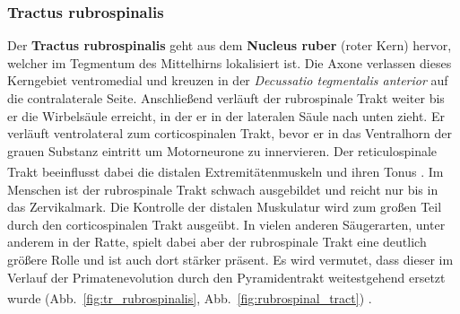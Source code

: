 \subsubsection{Tractus rubrospinalis}  \label{subsubsec:rubrospinalis}
Der \textbf{Tractus rubrospinalis} geht aus dem \textbf{Nucleus ruber} (roter Kern) hervor, welcher im Tegmentum des Mittelhirns lokalisiert ist. Die Axone verlassen dieses Kerngebiet ventromedial und kreuzen in der \textit{Decussatio tegmentalis anterior} auf die contralaterale Seite. Anschließend verläuft der rubrospinale Trakt weiter bis er die Wirbelsäule erreicht, in der er in der lateralen Säule nach unten zieht. Er verläuft ventrolateral zum corticospinalen Trakt, bevor er in das Ventralhorn der grauen Substanz eintritt um Motorneurone zu innervieren. Der reticulospinale Trakt beeinflusst dabei die distalen Extremitätenmuskeln und ihren Tonus \textsuperscript{\cite[8]{crossman2014neuroanatomy}}. Im Menschen ist der rubrospinale Trakt schwach ausgebildet und reicht nur bis in das Zervikalmark. Die Kontrolle der distalen Muskulatur wird zum großen Teil durch den corticospinalen Trakt ausgeübt. In vielen anderen Säugerarten, unter anderem in der Ratte, spielt dabei aber der rubrospinale Trakt eine deutlich größere Rolle und ist auch dort stärker präsent. Es wird vermutet, dass dieser im Verlauf der Primatenevolution durch den Pyramidentrakt weitestgehend ersetzt wurde (Abb.~\ref{fig:tr_rubrospinalis}, Abb.~\ref{fig:rubrospinal_tract}) \textsuperscript{\cite[14]{neurowissenschaften_baer}}. 
